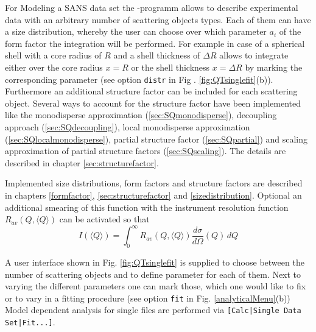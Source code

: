 For Modeling a SANS data set the \SASfit-programm allows to
describe experimental data with an arbitrary number of scattering
objects types. Each of them can have a size distribution, whereby
the user can choose over which parameter $a_i$ of the form factor
the integration will be performed. For example in case of a
spherical shell with a core radius of $R$ and a shell thickness of
$\Delta R$ \SASfit allows to integrate either over the core
radius $x=R$ or the shell thickness $x=\Delta R$ by marking the
corresponding parameter (see option {\tt distr} in Fig .
\ref{fig:QTsinglefit}(b)). Furthermore an additional structure factor
can be included for each scattering object. Several ways to account
for the structure factor have been implemented like the monodisperse
approximation (\ref{sec:SQmonodisperse}), decoupling approach
(\ref{sec:SQdecoupling}), local monodisperse approximation
(\ref{sec:SQlocalmonodisperse}), partial structure factor
(\ref{sec:SQpartial}) and scaling approximation of partial structure
factors (\ref{sec:SQscaling}). The details are described in chapter
\ref{sec:structurefactor}.

Implemented size distributions, form factors and structure factors
are described in chapters \ref{formfactor},
\ref{sec:structurefactor} and \ref{sizedistribution}. Optional an
additional smearing of this function with the instrument resolution
function $R_{av}\left(Q,\langle Q\rangle\right)$ can be activated so
that
\begin{equation}
I(\langle Q\rangle) = \int_0^\infty R_{av}\left(Q,\langle
Q\rangle\right) \frac{d\sigma}{d\Omega}(Q) \, dQ
\end{equation}

A user interface shown in Fig. \ref{fig:QTsinglefit} is supplied to
choose between the number of scattering objects and to define
parameter for each of them. Next to varying the different parameters
one can mark those, which one would like to fix or to vary in a
fitting procedure (see option {\tt fit} in Fig.
\ref{analyticalMenu}(b)) Model dependent analysis for single files
are performed via \verb"[Calc|Single Data Set|Fit...]".

